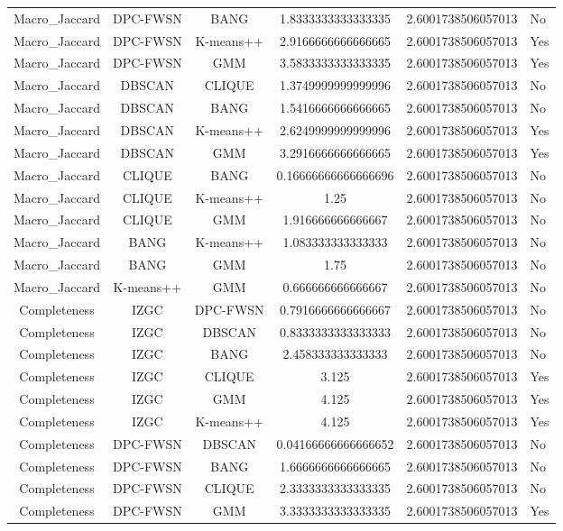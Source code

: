 \begin{table}[ht]
\begin{tabular}{cccc}
Macro_Jaccard & DPC-FWSN & BANG & 1.8333333333333335 & 2.6001738506057013 & No\\
Macro_Jaccard & DPC-FWSN & K-means++ & 2.9166666666666665 & 2.6001738506057013 & Yes\\
Macro_Jaccard & DPC-FWSN & GMM & 3.5833333333333335 & 2.6001738506057013 & Yes\\
Macro_Jaccard & DBSCAN & CLIQUE & 1.3749999999999996 & 2.6001738506057013 & No\\
Macro_Jaccard & DBSCAN & BANG & 1.5416666666666665 & 2.6001738506057013 & No\\
Macro_Jaccard & DBSCAN & K-means++ & 2.6249999999999996 & 2.6001738506057013 & Yes\\
Macro_Jaccard & DBSCAN & GMM & 3.2916666666666665 & 2.6001738506057013 & Yes\\
Macro_Jaccard & CLIQUE & BANG & 0.16666666666666696 & 2.6001738506057013 & No\\
Macro_Jaccard & CLIQUE & K-means++ & 1.25 & 2.6001738506057013 & No\\
Macro_Jaccard & CLIQUE & GMM & 1.916666666666667 & 2.6001738506057013 & No\\
Macro_Jaccard & BANG & K-means++ & 1.083333333333333 & 2.6001738506057013 & No\\
Macro_Jaccard & BANG & GMM & 1.75 & 2.6001738506057013 & No\\
Macro_Jaccard & K-means++ & GMM & 0.666666666666667 & 2.6001738506057013 & No\\
Completeness & IZGC & DPC-FWSN & 0.7916666666666667 & 2.6001738506057013 & No\\
Completeness & IZGC & DBSCAN & 0.8333333333333333 & 2.6001738506057013 & No\\
Completeness & IZGC & BANG & 2.458333333333333 & 2.6001738506057013 & No\\
Completeness & IZGC & CLIQUE & 3.125 & 2.6001738506057013 & Yes\\
Completeness & IZGC & GMM & 4.125 & 2.6001738506057013 & Yes\\
Completeness & IZGC & K-means++ & 4.125 & 2.6001738506057013 & Yes\\
Completeness & DPC-FWSN & DBSCAN & 0.04166666666666652 & 2.6001738506057013 & No\\
Completeness & DPC-FWSN & BANG & 1.6666666666666665 & 2.6001738506057013 & No\\
Completeness & DPC-FWSN & CLIQUE & 2.3333333333333335 & 2.6001738506057013 & No\\
Completeness & DPC-FWSN & GMM & 3.3333333333333335 & 2.6001738506057013 & Yes\\

\end{tabular}
\end{table}
